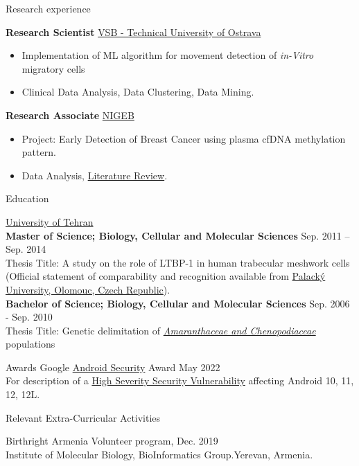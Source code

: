 \documentclass{resume}
\begin{document}
\begin{rSection}{Research experience}
\item \textbf{Research Scientist} \hfill \href{https://www.vsb.cz/en/university/contacts-maps-parking}{VSB - Technical University of Ostrava}
\begin{itemize}
    \itemsep -3pt {} 
     \item Implementation of ML algorithm for movement detection of \textit{in-Vitro} migratory cells 
     \item Clinical Data Analysis, Data Clustering, Data Mining.
 \end{itemize}
 
\item \textbf{Research Associate} \hfill \href{http://www.nigeb.ac.ir/web/en}{NIGEB}
\begin{itemize}
    \itemsep -3pt {} 
     \item Project: Early Detection of Breast Cancer using plasma cfDNA methylation pattern.
     \item Data Analysis, \href{https://ccij-online.org/article/serum-plasma-dna-methylation-pattern-and-early-detection-of-breast-cancer-336}{Literature Review}.
 \end{itemize}
\end{rSection}

\begin{rSection}{Education}

{\href{https://science.ut.ac.ir/en/web/biology}{University of Tehran}}\\
{\bf Master of Science; Biology, Cellular and Molecular Sciences} \hfill {Sep. 2011 -- Sep. 2014}\\
 Thesis Title: A study on the role of LTBP-1 in human trabecular meshwork cells\\
 (Official statement of comparability and recognition available from \href{https://www.upol.cz/en/}{Palacký University, Olomouc, Czech Republic}).\\
 
{\bf Bachelor of Science; Biology, Cellular and Molecular Sciences} \hfill {Sep. 2006 - Sep. 2010}\\
 Thesis Title: Genetic delimitation of \href{https://onlinelibrary.wiley.com/doi/abs/10.1111/boj.12015}{\textit{Amaranthaceae and Chenopodiaceae}} populations
 
\end{rSection}

\begin{rSection}{Awards}
Google \href{https://source.android.com/docs/security/overview/acknowledgements#may-2022}{Android Security} Award \hfill May 2022\\
For description of a \href {https://source.android.com/docs/security/bulletin/2022-05-01}{High Severity Security Vulnerability} affecting Android 10, 11, 12, 12L.
\end{rSection}

\begin{rSection}{Relevant Extra-Curricular Activities} 

    Birthright Armenia Volunteer program, \hfill Dec. 2019\\
   Institute of Molecular Biology, BioInformatics Group.\hfill Yerevan, Armenia.

\end{rSection}
\end{document}
